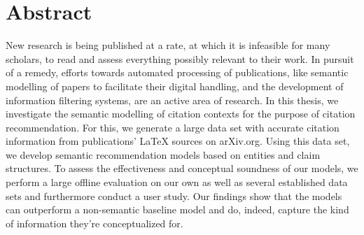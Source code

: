 \chapter*{Abstract}
New research is being published at a rate, at which it is %
infeasible for many scholars, to read and assess everything possibly %
relevant to their work. %
In pursuit of a remedy, efforts towards automated processing of publications, like semantic modelling of papers to facilitate their digital handling, and the development of information filtering systems, are an active area of research. %
In this thesis, we investigate the semantic modelling of citation contexts for the purpose of citation recommendation. For this, we generate a large data set with accurate citation information from publications' \LaTeX{} sources on arXiv.org. Using this data set, we develop semantic recommendation models based on entities and claim structures. To assess the effectiveness and conceptual soundness of our models, we perform a large offline evaluation on our own as well as several established data sets and furthermore conduct a user study. Our findings show that the models can outperform a non-semantic baseline model and do, indeed, capture the kind of information they're conceptualized for.



